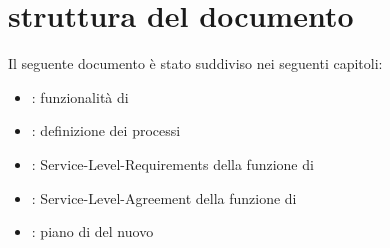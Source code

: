 %
%
\section[Struttura del documento]{struttura del documento}
\label{abs-document-structure}
Il seguente documento è stato suddiviso nei seguenti capitoli:

\begin{itemize}
\item{: funzionalità di }
\item{: definizione dei processi}
\item{: \ac{Service-Level-Requirements} della funzione di }
\item{: \ac{Service-Level-Agreement} della funzione di }
\item{: piano di  del nuovo }
\end{itemize}